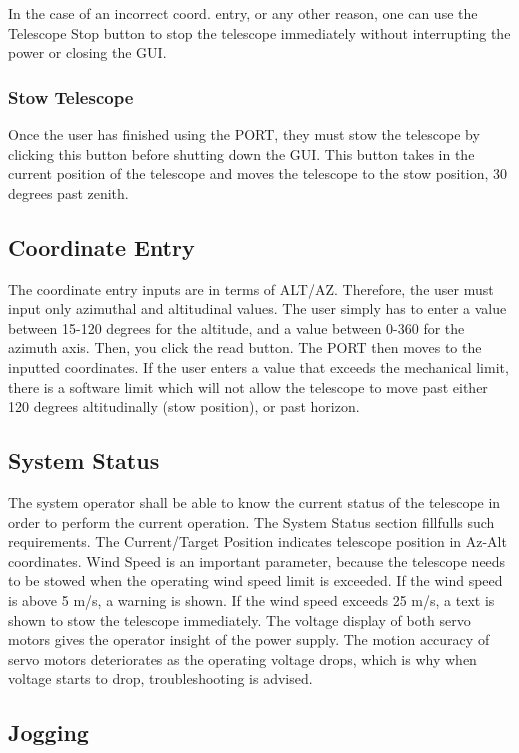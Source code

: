 \documentclass{article}
\begin{document}
In the case of an incorrect coord. entry, or any other reason, one can use the Telescope Stop button to stop the telescope immediately without interrupting the power or closing the GUI.

\subsubsection{Stow Telescope}

Once the user has finished using the PORT, they must stow the telescope by clicking this button before shutting down the GUI. This button takes in the current position of the telescope and moves the telescope to the stow position, 30 degrees past zenith. 

\subsection{Coordinate Entry}

The coordinate entry inputs are in terms of ALT/AZ. Therefore, the user must input only azimuthal and altitudinal values. The user simply has to enter a value between 15-120 degrees for the altitude, and a value between 0-360 for the azimuth axis. Then, you click the read button. The PORT then moves to the inputted coordinates. If the user enters a value that exceeds the mechanical limit, there is a software limit which will not allow the telescope to move past either 120 degrees altitudinally (stow position), or past horizon.

\subsection{System Status}

The system operator shall be able to know the current status of the telescope in order to perform the current operation. The System Status section fillfulls such requirements. The Current/Target Position indicates telescope position in Az-Alt coordinates. Wind Speed is an important parameter, because the telescope needs to be stowed when the operating wind speed limit is exceeded. If the wind speed is above 5 m/s, a warning is shown. If the wind speed exceeds 25 m/s, a text is shown to stow the telescope immediately. The voltage display of both servo motors gives the operator insight of the power supply. The motion accuracy of servo motors deteriorates as the operating voltage drops, which is why when voltage starts to drop, troubleshooting is advised.

\subsection{Jogging}
\end{document}
